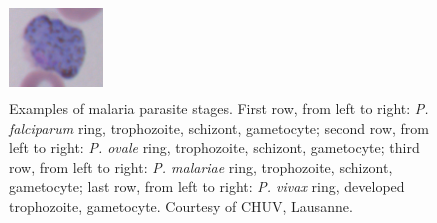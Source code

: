 \begin{figure}[H]
	\includegraphics[width=2.5cm, height=2.5cm]{images/malaria/vivax_4_gametocyte}
	\caption[Malaria parasite stages.]{\label{fig:malaria_stages}Examples of malaria parasite stages.
		First row, from left to right: \emph{P. falciparum} ring, trophozoite, schizont, gametocyte;
		second row, from left to right: \emph{P. ovale} ring, trophozoite, schizont, gametocyte;
		third row, from left to right: \emph{P. malariae} ring, trophozoite, schizont, gametocyte;
		last row, from left to right: \emph{P. vivax} ring, developed trophozoite, gametocyte.
		Courtesy of CHUV, Lausanne.}
\end{figure}

